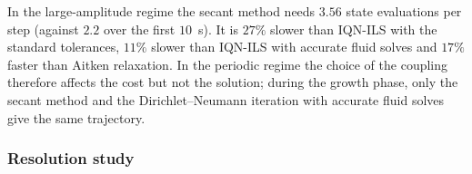 \documentclass[11pt,a4paper]{article}
\theoremstyle{definition}
\theoremstyle{remark}
\begin{document}
\begin{table}[ht]\centering
\caption{Periodic regime of FSI2, fluid $Q_6$, structure $Q_4$: mean $\pm$ amplitude
$[\text{frequency}]$ of the tip displacement over the last nine periods ($t\in[20,25]$), compared
with \cite{TurekHron2006}, and cost of the runs over $t\in[0,25]$ (four simultaneous runs with 4
processes each, about $18200$ time steps).}\label{tab:benchmark}
\end{table}

In the large-amplitude regime the secant method needs $3.56$ state evaluations per step (against
$2.2$ over the first $10$~s). It is $27\%$ slower than IQN-ILS with the standard tolerances, $11\%$
slower than IQN-ILS with accurate fluid solves and $17\%$ faster than Aitken relaxation. In the
periodic regime the choice of the coupling therefore affects the cost but not the solution; during
the growth phase, only the secant method and the Dirichlet--Neumann iteration with accurate fluid
solves give the same trajectory.

\subsubsection{Resolution study}\label{sec:resolution}
\end{document}
